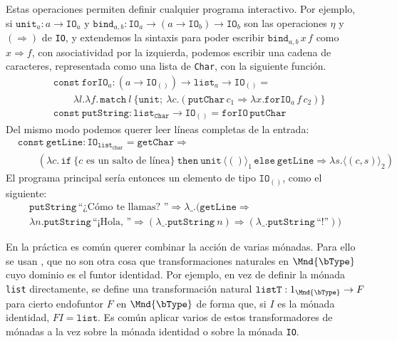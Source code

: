 Estas operaciones permiten definir cualquier programa interactivo. Por ejemplo,
si $\mathtt{unit}_a:a\to\mathtt{IO}_a$ y
$\mathtt{bind}_{a,b}:\mathtt{IO}_a\to(a\to\mathtt{IO}_b)\to\mathtt{IO}_b$ son
las operaciones $\eta$ y $(\Rightarrow)$ de \texttt{IO}, y extendemos la
sintaxis para poder escribir $\mathtt{bind}_{a,b}\,x\,f$ como $x\Rightarrow f$,
con asociatividad por la izquierda, podemos escribir una cadena de caracteres,
representada como una lista de \texttt{Char}, con la siguiente función.
\begin{align*}
  & \mathtt{const\ forIO}_a:(a\to \mathtt{IO}_{()})\to\mathtt{list}_a\to\mathtt{IO}_{()} =\\
  & \quad\quad \lambda l.\lambda f.\,\mathtt{match}\ l\ \{
    \mathtt{unit};\ \lambda c.(\mathtt{putChar}\,c_1\Rightarrow\lambda x.\mathtt{forIO}_a\,f\,c_2)\}\\
  & \mathtt{const\ putString} : \mathtt{list}_{\mathtt{Char}}\to\mathtt{IO}_{()}
    = \mathtt{forIO}\,\mathtt{putChar}
\end{align*}
Del mismo modo podemos querer leer líneas completas de la entrada:
\begin{align*}
  & \mathtt{const\ getLine}:\mathtt{IO}_{\mathtt{list}_{\mathtt{Char}}} =
    \mathtt{getChar}\Rightarrow\\
  & \quad\quad (\lambda c.\,
    \mathtt{if}\ \{c\text{ es un salto de línea}\}\ \mathtt{then}\ \mathtt{unit}\,\langle()\rangle_1\,
    \mathtt{else}\ \mathtt{getLine}\Rightarrow\lambda s.\langle(c,s)\rangle_2)
\end{align*}
El programa principal sería entonces un elemento de tipo $\mathtt{IO}_{()}$,
como el siguiente:
\begin{multline*}
  \mathtt{putString}\,\text{``¿Cómo te llamas? ''}\Rightarrow\lambda\_.
  (\mathtt{getLine}\Rightarrow\\
  \lambda n.\mathtt{putString}\,\text{``¡Hola, ''}\Rightarrow
  (\lambda\_.\mathtt{putString}\ n)\Rightarrow(\lambda\_.\mathtt{putString}\,\text{``!''}))
\end{multline*}

En la práctica es común querer combinar la acción de varias mónadas. Para ello
se usan , que no son otra cosa que
transformaciones naturales en $\Mnd{\bType}$ cuyo dominio es el funtor
identidad. Por ejemplo, en vez de definir la mónada \texttt{list} directamente,
se define una transformación natural $\mathtt{listT}:1_{\Mnd{\bType}}\to F$ para
cierto endofuntor $F$ en $\Mnd{\bType}$ de forma que, si $I$ es la mónada
identidad, $FI=\mathtt{list}$.\cite{monad-trans} Es común aplicar varios de
estos transformadores de mónadas a la vez sobre la mónada identidad o sobre la
mónada \texttt{IO}.

